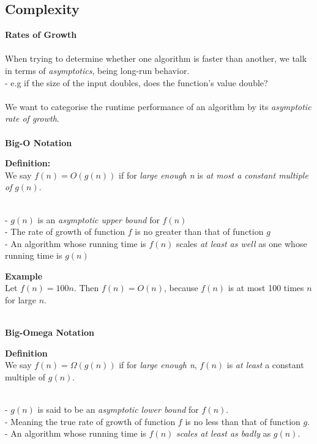 \documentclass{article}
\begin{document}
\subsection{Complexity}
\textbf{Rates of Growth} \\\\
When trying to determine whether one algorithm is faster than another, we talk in terms of \emph{asymptotics}, being long-run behavior. \\
- e.g if the size of the input doubles, does the function's value double? 
\\\\
We want to categorise the runtime performance of an algorithm by its \emph{asymptotic rate of growth}.
\\\\
\textbf{Big-O Notation}
\\
\begin{tcolorbox}
\textbf{Definition:} \\
We say $f(n) = O(g(n))$ if for \emph{large enough n} is \emph{at most a constant multiple of} $g(n)$.
\end{tcolorbox}
~\\
- $g(n)$ is an \emph{asymptotic upper bound} for $f(n)$ \\
- The rate of growth of function $f$ is no greater than that of function $g$ \\
- An algorithm whose running time is $f(n)$ scales \emph{at least as well} as one whose running time is $g(n)$
\\
\begin{tcolorbox}
    \textbf{Example} \\
    Let $f(n) = 100n$. Then $f(n) = O(n)$, because $f(n)$ is at most 100 times $n$ for large $n$.
\end{tcolorbox}
~\\
\textbf{Big-Omega Notation}
\\
\begin{tcolorbox}
    \textbf{Definition} \\
    We say $f(n) = \Omega(g(n))$ if for \emph{large enough n}, $f(n)$ is \emph{at least} a constant multiple of $g(n)$.
\end{tcolorbox}
~\\
- $g(n)$ is said to be an \emph{asymptotic lower bound} for $f(n)$. \\
- Meaning the true rate of growth of function $f$ is no less than that of function $g$. \\
- An algorithm whose running time is $f(n)$ \emph{scales at least as badly} as $g(n)$.
\end{document}
